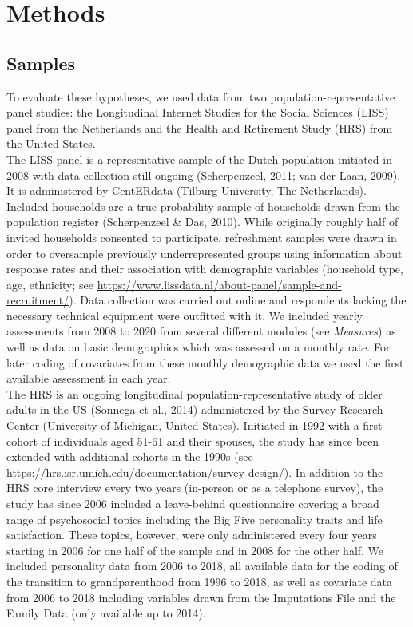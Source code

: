 \documentclass[
  english,
  man, noextraspace]{apa7}
\begin{document}
\newpage

\hypertarget{methods}{%
\section{Methods}\label{methods}}

\hypertarget{samples}{%
\subsection{Samples}\label{samples}}

To evaluate these hypotheses, we used data from two population-representative panel studies: the Longitudinal Internet Studies for the Social Sciences (LISS) panel from the Netherlands and the Health and Retirement Study (HRS) from the United States.\\
The LISS panel is a representative sample of the Dutch population initiated in 2008 with data collection still ongoing (Scherpenzeel, 2011; van der Laan, 2009). It is administered by CentERdata (Tilburg University, The Netherlands). Included households are a true probability sample of households drawn from the population register (Scherpenzeel \& Das, 2010). While originally roughly half of invited households consented to participate, refreshment samples were drawn in order to oversample previously underrepresented groups using information about response rates and their association with demographic variables (household type, age, ethnicity; see \url{https://www.lissdata.nl/about-panel/sample-and-recruitment/}). Data collection was carried out online and respondents lacking the necessary technical equipment were outfitted with it. We included yearly assessments from 2008 to 2020 from several different modules (see \emph{Measures}) as well as data on basic demographics which was assessed on a monthly rate. For later coding of covariates from these monthly demographic data we used the first available assessment in each year.\\
The HRS is an ongoing longitudinal population-representative study of older adults in the US (Sonnega et al., 2014) administered by the Survey Research Center (University of Michigan, United States). Initiated in 1992 with a first cohort of individuals aged 51-61 and their spouses, the study has since been extended with additional cohorts in the 1990s (see \url{https://hrs.isr.umich.edu/documentation/survey-design/}). In addition to the HRS core interview every two years (in-person or as a telephone survey), the study has since 2006 included a leave-behind questionnaire covering a broad range of psychosocial topics including the Big Five personality traits and life satisfaction. These topics, however, were only administered every four years starting in 2006 for one half of the sample and in 2008 for the other half. We included personality data from 2006 to 2018, all available data for the coding of the transition to grandparenthood from 1996 to 2018, as well as covariate data from 2006 to 2018 including variables drawn from the Imputations File and the Family Data (only available up to 2014).\\
\end{document}
